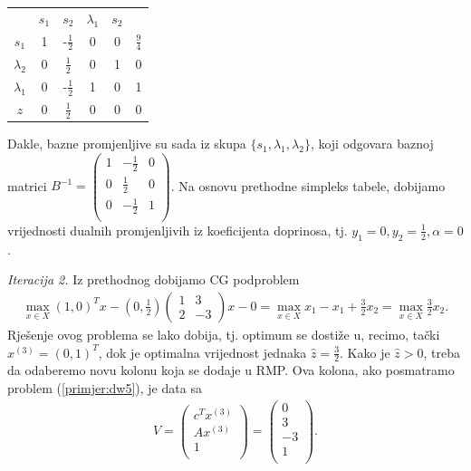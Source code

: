 \documentclass[a4paper, utf8, 11pt, colorlinks]{book}
\theoremstyle{definition}
\begin{document}
\begin{center}
	
	\begin{tabular}{c|ccccc}
	             	&$s_1$     &    $ s_2$                &  $\lambda_1$   & $s_2$     &                \\
		$s_1$	    &   1      &   -$\frac{1}{2}$         &   0         &     0         &  $\frac{9}{4}$ \\
		$\lambda_2$ &   0      &    $\frac{1}{2}$         &   0         &     1         &  0             \\
		$\lambda_1$ &   0      &    -$\frac{1}{2}$        &   1         &     0         &  1             \\ \hline
		$z$         &   0      &    $\frac{1}{2}$         &   0         &    0          &  0
	\end{tabular}
\end{center} 
Dakle, bazne promjenljive su sada iz skupa $\{s_1, \lambda_1, \lambda_2\}$, koji odgovara baznoj matrici 
$B^{-1} = 
\begin{pmatrix}
	   1 & -\frac{1}{2}    &  0 \\
	   0 & \frac{1}{2}     &  0  \\
	   0 & -\frac{1}{2}    &  1  \\
\end{pmatrix}$.
Na osnovu prethodne simpleks tabele, dobijamo   vrijednosti dualnih promjenljivih iz koeficijenta doprinosa, tj. $y_1 = 0, y_2 = \frac{1}{2}, \alpha = 0$. 


\vspace{5mm}

\emph{Iteracija 2.} Iz prethodnog dobijamo CG podproblem 
\begin{align}
	 \max_{x \in X} (1, 0)^T x - \left(0, \frac{1}{2}\right)\left(\begin{array}{cc}
	 	1 & 3 \\
	 	2 & -3
	 \end{array}\right)  x   - 0 = \max_{x \in X}x_1 - x_1 + \frac{3}{2}x_2 = \max_{x \in X} \frac{3}{2}x_2.
\end{align}
Rješenje ovog problema se lako dobija, tj. optimum se dostiže u, recimo,  tački $x^{(3)}= (0, 1)^T$, dok je optimalna vrijednost jednaka $\hat{z}= \frac{3}{2}$. Kako je $\hat{z} > 0$, treba da odaberemo novu kolonu koja se dodaje u RMP. 
Ova kolona, ako posmatramo problem (\ref{primjer:dw5}), je   data sa 
\begin{align}
	V =   \begin{pmatrix}
		c^T  x^{(3)}\\
		A  x^{(3)}  \\
		1     \\
	\end{pmatrix} = \begin{pmatrix}
		0 \\
		3  \\
		-3  \\
		1\\  
	\end{pmatrix}.
\end{align}
\end{document}
